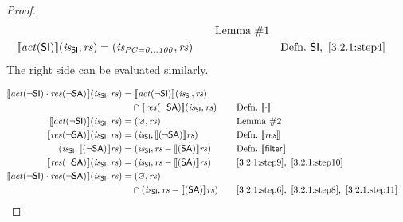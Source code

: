 \documentclass[12pt, letterpaper]{article}
\let\emptyset\varnothing
\newcommand\interp[1]{\llbracket #1 \rrbracket}
\begin{document}
\begin{proof}
{\begin{alignat}{2}
     &&\quad \text{Lemma \#1}\\
     \label{3.2.1:step5}
     \interp{ \mathit{act} (\mathsf{SI}) } (\mathit{is_{\mathsf{SI}}}, \mathit{rs})  
     &=
     (\mathit{is_{PC=0\ldots 100}}, \mathit{rs})
     &&\quad \text{Defn.}\ \mathsf{SI},\ \ref{3.2.1:step4}
 \end{alignat}
 }%
     The right side can be evaluated similarly.
 \par\nobreak
 {\fontsize{10pt}{12pt}\selectfont
 \begin{alignat}{2}
     \label{3.2.1:step6}
     \interp{ \mathit{act}(\neg\mathsf{SI}) \cdot
      \mathit{res}(\neg\mathsf{SA}) } (\mathit{is_{\mathsf{SI}}}, \mathit{rs})
     &=
     \interp{ \mathit{act}(\neg\mathsf{SI}) } (\mathit{is_{\mathsf{SI}}}, \mathit{rs})\\ %
     &\quad \cap
     \interp{ \mathit{res}(\neg\mathsf{SA}) } (\mathit{is_{\mathsf{SI}}}, \mathit{rs})
     &&\quad \text{Defn.}\ \interp{\cdot}
     \\ %
     \label{3.2.1:step8}
     \interp{ \mathit{act}(\neg\mathsf{SI}) } (\mathit{is_{\mathsf{SI}}}, \mathit{rs})
     &=
     (\emptyset, \mathit{rs})
     &&\quad \text{Lemma \#2}
     \\
     \label{3.2.1:step9}
     \interp{ \mathit{res}(\neg\mathsf{SA}) } (\mathit{is_{\mathsf{SI}}}, \mathit{rs})
     &=
     (\mathit{is_{\mathsf{SI}}}, \interp{ (\neg\mathsf{SA}) } \mathit{rs})
     &&\quad \text{Defn.}\ \interp{\mathit{res}}
     \\
     \label{3.2.1:step10}
     (\mathit{is_{\mathsf{SI}}}, \interp{ (\neg\mathsf{SA}) } \mathit{rs})
     &=
     (\mathit{is_{\mathsf{SI}}}, \mathit{rs} - \interp{ (\mathsf{SA}) } \mathit{rs})
     &&\quad \text{Defn.}\ \interp{\mathsf{filter}}
     \\
     \label{3.2.1:step11}
     \interp{ \mathit{res}(\neg\mathsf{SA}) } (\mathit{is_{\mathsf{SI}}}, \mathit{rs})
     &=
     (\mathit{is_{\mathsf{SI}}}, \mathit{rs} - \interp{ (\mathsf{SA}) } \mathit{rs})
     &&\quad \ref{3.2.1:step9},\ \ref{3.2.1:step10}
     \\
     \label{3.2.1:step12}
     \interp{ \mathit{act}(\neg\mathsf{SI}) \cdot
      \mathit{res}(\neg\mathsf{SA}) } (\mathit{is_{\mathsf{SI}}}, \mathit{rs})
     &=
     (\emptyset, \mathit{rs})
     \\
     &\quad \cap
     (\mathit{is_{\mathsf{SI}}}, \mathit{rs} - \interp{ (\mathsf{SA}) } \mathit{rs})
     &&\quad \ref{3.2.1:step6},\ \ref{3.2.1:step8},\ \ref{3.2.1:step11}

\end{alignat}}
\end{proof}
\end{document}
